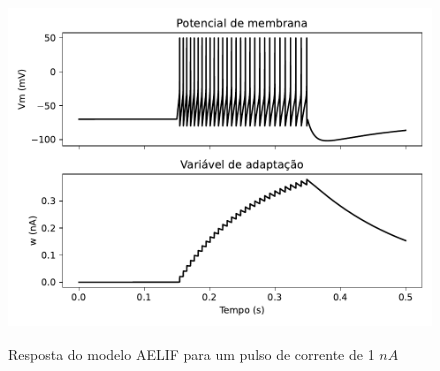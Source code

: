 \begin{figure}[tb]
	\centering
	\caption[Resposta do modelo AELIF]{Resposta do modelo AELIF para um pulso de corrente de 1 $nA$}
	\label{fig:adexrs}
	\includegraphics[width=0.7\linewidth]{figs/aelif}\\
\end{figure}


